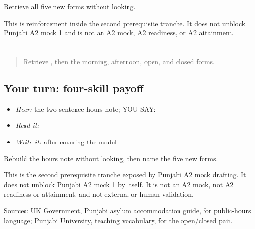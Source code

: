 \begin{tcolorbox}[breakable,colback=teal!4,colframe=teal!35!black,title={Before you move on}]
Retrieve all five new forms without looking.

This is reinforcement inside the second prerequisite tranche. It does not unblock Punjabi A2 mock 1 and is not an A2 mock, A2 readiness, or A2 attainment.
\end{tcolorbox}
\section[\texorpdfstring{\pa{ਬਾਗ਼} \pa{ਸਵੇਰੇ} \pa{ਅੱਠ} \pa{ਵਜੇ} … (baagh savere …)}{ਬਾਗ਼ ਸਵੇਰੇ ਅੱਠ ਵਜੇ … (baagh savere …)}]{          }

\label{lesson:PA-C179-payoff}



\begin{quote}
Retrieve \textbf{}, then the morning, afternoon, open, and closed forms.
\end{quote}

\subsection*{Your turn: four-skill payoff}
\begin{quote}
\textbf{          }
\end{quote}

\begin{itemize}
\raggedright
  \item \emph{Hear:} the two-sentence hours note; YOU SAY: \textbf{          }
  \item \emph{Read it:} \textbf{          }
  \item \emph{Write it:} \textbf{          } after covering the model
\end{itemize}

\begin{tcolorbox}[breakable,colback=teal!4,colframe=teal!35!black,title={Before you move on}]
Rebuild the hours note without looking, then name the five new forms.

This is the second prerequisite tranche exposed by Punjabi A2 mock drafting. It does not unblock Punjabi A2 mock 1 by itself. It is not an A2 mock, not A2 readiness or attainment, and not external or human validation.

Sources: UK Government, \href{https://assets.publishing.service.gov.uk/media/5d947f3340f0b65e64bf87ea/Pack\_B\_-\_Punjabi\_-\_Web.pdf}{Punjabi asylum accommodation guide}, for public-hours language; Punjabi University, \href{https://pnarang.weebly.com/uploads/1/4/5/6/14563640/vocab\_f.pdf}{teaching vocabulary}, for the open/closed pair.
\end{tcolorbox}
